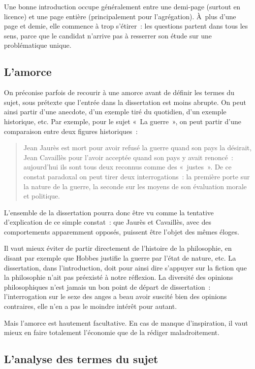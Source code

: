 \documentclass[a4paper]{article}
\begin{document}
Une bonne introduction occupe généralement entre une demi-page (surtout
en licence) et une page entière (principalement pour l'agrégation).
À plus d'une page et demie, elle commence à trop s'étirer : les
questions partent dans tous les sens, parce que le candidat n'arrive pas
à resserrer son étude sur une problématique unique.

\subsection{L'amorce}
\label{sec-2-1}

On préconise parfois de recourir à une amorce avant de définir les
termes du sujet, sous prétexte que l'entrée dans la dissertation est
moins abrupte. On peut ainsi partir d'une anecdote, d'un exemple tiré du
quotidien, d'un exemple historique, etc. Par exemple, pour le sujet « La
guerre », on peut partir d'une comparaison entre deux figures
historiques :

\begin{quote}
Jean Jaurès est mort pour avoir refusé la guerre quand son pays la
désirait, Jean Cavaillès pour l'avoir acceptée quand son pays y avait
renoncé : aujourd'hui ils sont tous deux reconnus comme des « justes ».
De ce constat paradoxal on peut tirer deux interrogations : la
première porte sur la nature de la guerre, la seconde sur les moyens
de son évaluation morale et politique.
\end{quote}

L'ensemble de la dissertation pourra donc être vu comme la tentative
d'explication de ce simple constat : que Jaurès et Cavaillès, avec des
comportements apparemment opposés, puissent être l'objet des mêmes
éloges.

Il vaut mieux éviter de partir directement de l'histoire de la
philosophie, en disant par exemple que Hobbes justifie la guerre par
l'état de nature, etc. La dissertation, dans l'introduction, doit pour
ainsi dire s'appuyer sur la fiction que la philosophie n'ait pas
préexisté à notre réflexion. La diversité des opinions philosophiques
n'est jamais un bon point de départ de dissertation : l'interrogation
sur le sexe des anges a beau avoir suscité bien des opinions contraires,
elle n'en a pas le moindre intérêt pour autant.

Mais l'amorce est hautement facultative. En cas de manque d'inspiration,
il vaut mieux en faire totalement l'économie que de la rédiger
maladroitement.

\subsection{L'analyse des termes du sujet}
\label{sec-2-2}
\end{document}
